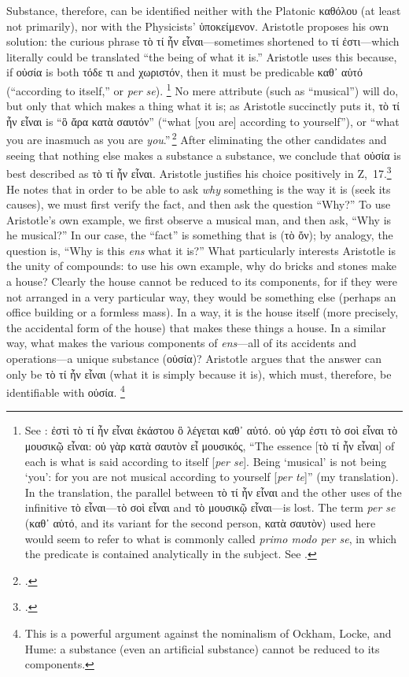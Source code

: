 Substance, therefore, can be identified neither with the Platonic καθόλου (at least not primarily), nor with the Physicists’ ὑποκείμενον. Aristotle proposes his own solution: the curious phrase τὸ τί ἦν εἶναι—sometimes shortened to τί ἐστι—which literally could be translated “the being of what it is.” Aristotle uses this because, if οὐσία is both τόδε τι and χωριστόν, then it must be predicable καθ᾽ αὑτό (“according to itself,” or \emph{per se}).%
%
\footnote{See \cite[Ζ,~3, 1029b14-15]{aristotle:metaphysics}: ἐστὶ τὸ τί ἦν εἶναι ἑκάστου ὃ λέγεται καθ᾽ αὑτό. οὐ γάρ ἐστι τὸ σοὶ εἶναι τὸ μουσικῷ εἶναι: οὐ γὰρ κατὰ σαυτὸν εἶ μουσικός, “The essence [τὸ τί ἦν εἶναι] of each is what is said according to itself [\emph{per se}]. Being ‘musical’ is not being ‘you’: for you are not musical according to yourself [\emph{per te}]” (my translation). In the translation, the parallel between τὸ τί ἦν εἶναι and the other uses of the infinitive τὸ εἶναι—τὸ σοὶ εἶναι and τὸ μουσικῷ εἶναι—is lost. The term \emph{per se} (καθ᾽ αὑτό, and its variant for the second person, κατὰ σαυτὸν) used here would seem to refer to what is commonly called \emph{primo modo per se}, in which the predicate is contained analytically in the subject. See \cite[I,~10]{st:post-anal}.}
%
No mere attribute (such as “musical”) will do, but only that which makes a thing what it is; as Aristotle succinctly puts it, τὸ τί ἦν εἶναι is “ὃ ἄρα κατὰ σαυτόν” (“what [you are] according to yourself”), or “what you are inasmuch as you are \emph{you}.”\,\footcite[Ζ,~3, 1029b16]{aristotle:metaphysics} After eliminating the other candidates and seeing that nothing else makes a substance a substance, we conclude that οὐσία is best described as τὸ τί ἦν εἶναι. Aristotle justifies his choice positively in Ζ,~17.\footcite[See][Ζ,~17, 1041a5–1041b31]{aristotle:metaphysics} He notes that in order to be able to ask \emph{why} something is the way it is (seek its causes), we must first verify the fact, and then ask the question “Why?” To use Aristotle’s own example, we first observe a musical man, and then ask, “Why is he musical?” In our case, the “fact” is something that is (τὸ ὄν); by analogy, the question is, “Why is this \emph{ens} what it is?” What particularly interests Aristotle is the unity of compounds: to use his own example, why do bricks and stones make a house? Clearly the house cannot be reduced to its components, for if they were not arranged in a very particular way, they would be something else (perhaps an office building or a formless mass). In a way, it is the house itself (more precisely, the accidental form of the house) that makes these things a house. In a similar way, what makes the various components of \emph{ens}—all of its accidents and operations—a unique substance (οὐσία)? Aristotle argues that the answer can only be τὸ τί ἦν εἶναι (what it is simply because it is), which must, therefore, be identifiable with οὐσία.%
%
\footnote{This is a powerful argument against the nominalism of Ockham, Locke, and Hume: a substance (even an artificial substance) cannot be reduced to its components.}

